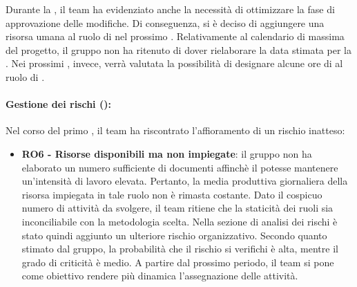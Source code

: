 \vspace{0.5\baselineskip}
\par Durante la , il team ha evidenziato anche la necessità di ottimizzare la fase di approvazione delle modifiche. Di conseguenza, si è deciso di aggiungere una risorsa umana al ruolo di \Verificatore{} nel prossimo . Relativamente al calendario di massima del progetto, il gruppo non ha ritenuto di dover rielaborare la data stimata per la . Nei prossimi , invece, verrà valutata la possibilità di designare alcune ore di \Progettista{} al ruolo di \Amministratore{}.

\paragraph*{Gestione dei rischi ():}
\par Nel corso del primo , il team ha riscontrato l'affioramento di un rischio inatteso:
\begin{itemize}
  \item \textbf{RO6 - Risorse disponibili ma non impiegate}: il gruppo non ha elaborato un numero sufficiente di documenti affinchè il \Verificatore{} potesse mantenere un'intensità di lavoro elevata. Pertanto, la media produttiva giornaliera della risorsa impiegata in tale ruolo non è rimasta costante. Dato il cospicuo numero di attività da svolgere, il team ritiene che la staticità dei ruoli sia inconciliabile con la metodologia scelta. Nella sezione di analisi dei rischi è stato quindi aggiunto un ulteriore rischio organizzativo. Secondo quanto stimato dal gruppo, la probabilità che il rischio si verifichi è alta, mentre il grado di criticità è medio. A partire dal prossimo periodo, il team si pone come obiettivo rendere più dinamica l'assegnazione delle attività.
\end{itemize}

